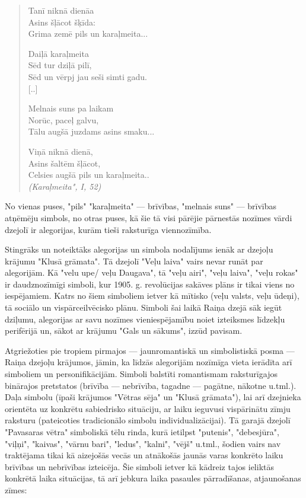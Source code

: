 \documentclass[11pt]{article}
\begin{document}
\begin{quote}
Tanī niknā dienāa\\
Asins šļācot šķīda:\\
Grima zemē pils un karaļmeita...

Daiļā karaļmeita\\
Sēd tur dziļā pilī,\\
Sēd un vērpj jau seši simti gadu.\\
\mbox{}[..]

Melnais suns pa laikam\\
Norūc, paceļ galvu,\\
Tālu augšā juzdams asins smaku...

Viņā niknā dienā,\\
Asins šaltēm šļācot,\\
Celsies augšā pils un karaļmeita..\\
{\em (Karaļmeita", I, 52)}
\end{quote}

No vienas puses, "pils" "karaļmeita" --- brīvības,
"melnais suns" --- brīvības atņēmēju simbols,
no otras puses, kā šie tā visi pārējie pārnestās nozīmes vārdi
dzejolī ir alegorijas, kurām tieši raksturīga viennozīmība.

Stingrāks un noteiktāks alegorijas un simbola nodalījums
ienāk ar dzejoļu krājumu "Klusā grāmata".
Tā dzejolī "Veļu laiva" vairs nevar runāt par
alegorijām. Kā "velu upe/ veļu Daugava", tā
"veļu airi", "veļu laiva", "veļu rokas" ir
daudznozīmīgi simboli, kur 1905. g. revolūcijas sakāves
plāns ir tikai viens no iespējamiem. Katrs no šiem
simboliem ietver kā mītisko (veļu valsts, veļu
ūdeņi), tā sociālo un vispārceilvēcisko plānu.
Simboli šai laikā Raiņa dzejā sāk iegūt dziļumu,
alegorijas ar savu nozīmes vieniespējamību
noiet izteiksmes līdzekļu perifērijā un, sākot ar krājumu
"Gals un sākums", izzūd pavisam.

{\color{red}
Atgriežoties pie tropiem pirmajos --- jaunromantiskā
un simbolistiskā posma --- Raiņa dzejoļu krājumos,
jāmin, ka līdzās alegorijām nozīmīga vieta ierādīta
arī simboliem un personifikācijām. }
Simboli balstīti romantismam raksturīgajos binārajos
pretstatos (brīvība --- nebrīvība, tagadne ---
pagātne, nākotne u.tml.). Daļa simbolu
(īpaši krājumos "Vētras sēja" un "Klusā grāmata"),
lai arī dzejnieka orientēta uz konkrētu sabiedrisko
situāciju, ar laiku ieguvusi vispārinātu zīmju raksturu
(pateicoties tradicionālo simbolu individualizācijai).
Tā garajā dzejolī "Pavasaras vētra" simboliskā tēlu rinda,
kurā ietilpst "putenis", "debesjūra", "viļņi", "kaivas",
"vārnu bari", "ledus", "kalni", "vējš" u.tml.,
šodien vairs nav traktējama tikai kā aizejošās vecās
un atnākošās jaunās varas konkrēto laiku brīvības un
nebrīvības izteicēja. Šie simboli ietver kā kādreiz tajos ieliktās
konkrētā laika situācijas, tā arī jebkura laika pasaules
pārradīšanas, atjaunošanas zīmes:
\end{document}
